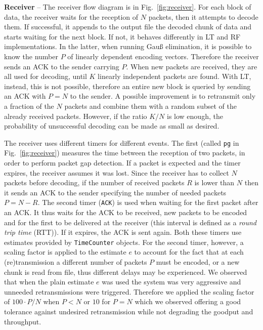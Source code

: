 \textbf{Receiver} -- The receiver flow diagram is in Fig.~\ref{fig:receiver}. 
For each block of data, the receiver waits for the reception of $N$ packets, then it attempts to decode them. If successful, it appends to the output file the decoded chunk of data and starts waiting for the next block. If not, it behaves differently in LT and RF implementations. In the latter, when running Gau{\ss} elimination, it is possible to know the number $P$ of linearly dependent encoding vectors. Therefore the receiver sends an ACK to the sender carrying $P$. When new packets are received, they are all used for decoding, until $K$ linearly independent packets are found. 
With LT, instead, this is not possible, therefore an entire new block is queried by sending an ACK with $P=N$ to the sender. A possible improvement is to retransmit only a fraction of the $N$ packets and combine them with a random subset of the already received packets. However, if the ratio $K/N$ is low enough, the probability of unsuccessful decoding can be made as small as desired. 

The receiver uses different timers for different events. The first (called \texttt{pg} in Fig.~\ref{fig:receiver}) measures the time between the reception of two packets, in order to perform packet gap detection. If a packet is expected and the timer expires, the receiver assumes it was lost. Since the receiver has to collect $N$ packets before decoding, if the number of received packets $R$ is lower than $N$ then it sends an ACK to the sender specifying the number of needed packets $P = N - R$. The second timer (\texttt{ACK}) is used when waiting for the first packet after an ACK. It thus waits for the ACK to be received, new packets to be encoded and for the first to be delivered at the receiver (this interval is defined as a \textit{round trip time} (RTT)). If it expires, the ACK is sent again. Both these timers use estimates provided by \texttt{TimeCounter} objects. For the second timer, however, a scaling factor is applied to the estimate $e$ to account for the fact that at each (re)transmission a different number of packets $P$ must be encoded, or a new chunk is read from file, thus different delays may be experienced. We observed that when the plain estimate $e$ was used the system was very aggressive and unneeded retransmissions were triggered. Therefore we applied the scaling factor of $100 \cdot P / N$ when $P < N$ or $10$ for $P = N$ which we observed offering a good tolerance against undesired retransmission while not degrading the goodput and throughput.

